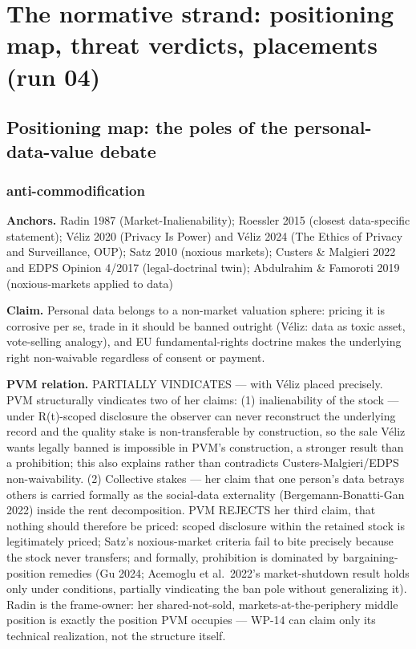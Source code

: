 \documentclass[
  11pt,
]{article}
\begin{document}
\newpage

\section{The normative strand: positioning map, threat verdicts,
placements (run
04)}\label{the-normative-strand-positioning-map-threat-verdicts-placements-run-04}

\subsection{Positioning map: the poles of the personal-data-value
debate}\label{positioning-map-the-poles-of-the-personal-data-value-debate}

\subsubsection{anti-commodification}\label{anti-commodification}

\textbf{Anchors.} Radin 1987 (Market-Inalienability); Roessler 2015
(closest data-specific statement); Véliz 2020 (Privacy Is Power) and
Véliz 2024 (The Ethics of Privacy and Surveillance, OUP); Satz 2010
(noxious markets); Custers \& Malgieri 2022 and EDPS Opinion 4/2017
(legal-doctrinal twin); Abdulrahim \& Famoroti 2019 (noxious-markets
applied to data)

\textbf{Claim.} Personal data belongs to a non-market valuation sphere:
pricing it is corrosive per se, trade in it should be banned outright
(Véliz: data as toxic asset, vote-selling analogy), and EU
fundamental-rights doctrine makes the underlying right non-waivable
regardless of consent or payment.

\textbf{PVM relation.} PARTIALLY VINDICATES --- with Véliz placed
precisely. PVM structurally vindicates two of her claims: (1)
inalienability of the stock --- under R(t)-scoped disclosure the
observer can never reconstruct the underlying record and the quality
stake is non-transferable by construction, so the sale Véliz wants
legally banned is impossible in PVM's construction, a stronger result
than a prohibition; this also explains rather than contradicts
Custers-Malgieri/EDPS non-waivability. (2) Collective stakes --- her
claim that one person's data betrays others is carried formally as the
social-data externality (Bergemann-Bonatti-Gan 2022) inside the rent
decomposition. PVM REJECTS her third claim, that nothing should
therefore be priced: scoped disclosure within the retained stock is
legitimately priced; Satz's noxious-market criteria fail to bite
precisely because the stock never transfers; and formally, prohibition
is dominated by bargaining-position remedies (Gu 2024; Acemoglu et
al.~2022's market-shutdown result holds only under conditions, partially
vindicating the ban pole without generalizing it). Radin is the
frame-owner: her shared-not-sold, markets-at-the-periphery middle
position is exactly the position PVM occupies --- WP-14 can claim only
its technical realization, not the structure itself.
\end{document}
